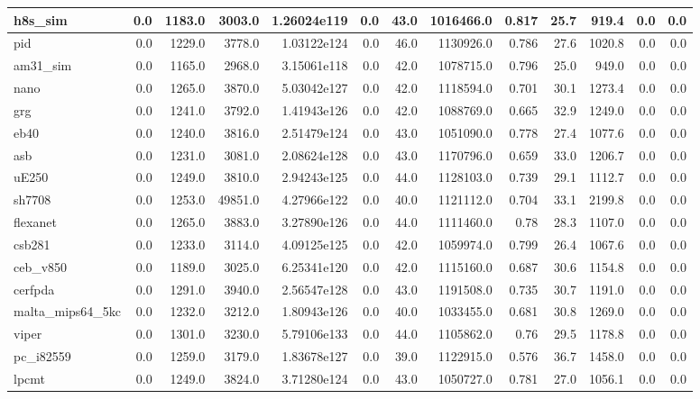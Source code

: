 \begin{tabular}{|l r r r r| r r r r r r | r r|}
\hline
h8s\_sim & 0.0 & 1183.0 & 3003.0 & 1.26024e119 & 0.0 & 43.0 & 1016466.0 & 0.817 & 25.7 & 919.4 & 0.0 & 0.0 \\
\hline
pid & 0.0 & 1229.0 & 3778.0 & 1.03122e124 & 0.0 & 46.0 & 1130926.0 & 0.786 & 27.6 & 1020.8 & 0.0 & 0.0 \\
\hline
am31\_sim & 0.0 & 1165.0 & 2968.0 & 3.15061e118 & 0.0 & 42.0 & 1078715.0 & 0.796 & 25.0 & 949.0 & 0.0 & 0.0 \\
\hline
nano & 0.0 & 1265.0 & 3870.0 & 5.03042e127 & 0.0 & 42.0 & 1118594.0 & 0.701 & 30.1 & 1273.4 & 0.0 & 0.0 \\
\hline
grg & 0.0 & 1241.0 & 3792.0 & 1.41943e126 & 0.0 & 42.0 & 1088769.0 & 0.665 & 32.9 & 1249.0 & 0.0 & 0.0 \\
\hline
eb40 & 0.0 & 1240.0 & 3816.0 & 2.51479e124 & 0.0 & 43.0 & 1051090.0 & 0.778 & 27.4 & 1077.6 & 0.0 & 0.0 \\
\hline
asb & 0.0 & 1231.0 & 3081.0 & 2.08624e128 & 0.0 & 43.0 & 1170796.0 & 0.659 & 33.0 & 1206.7 & 0.0 & 0.0 \\
\hline
uE250 & 0.0 & 1249.0 & 3810.0 & 2.94243e125 & 0.0 & 44.0 & 1128103.0 & 0.739 & 29.1 & 1112.7 & 0.0 & 0.0 \\
\hline
sh7708 & 0.0 & 1253.0 & 49851.0 & 4.27966e122 & 0.0 & 40.0 & 1121112.0 & 0.704 & 33.1 & 2199.8 & 0.0 & 0.0 \\
\hline
flexanet & 0.0 & 1265.0 & 3883.0 & 3.27890e126 & 0.0 & 44.0 & 1111460.0 & 0.78 & 28.3 & 1107.0 & 0.0 & 0.0 \\
\hline
csb281 & 0.0 & 1233.0 & 3114.0 & 4.09125e125 & 0.0 & 42.0 & 1059974.0 & 0.799 & 26.4 & 1067.6 & 0.0 & 0.0 \\
\hline
ceb\_v850 & 0.0 & 1189.0 & 3025.0 & 6.25341e120 & 0.0 & 42.0 & 1115160.0 & 0.687 & 30.6 & 1154.8 & 0.0 & 0.0 \\
\hline
cerfpda & 0.0 & 1291.0 & 3940.0 & 2.56547e128 & 0.0 & 43.0 & 1191508.0 & 0.735 & 30.7 & 1191.0 & 0.0 & 0.0 \\
\hline
malta\_mips64\_5kc & 0.0 & 1232.0 & 3212.0 & 1.80943e126 & 0.0 & 40.0 & 1033455.0 & 0.681 & 30.8 & 1269.0 & 0.0 & 0.0 \\
\hline
viper & 0.0 & 1301.0 & 3230.0 & 5.79106e133 & 0.0 & 44.0 & 1105862.0 & 0.76 & 29.5 & 1178.8 & 0.0 & 0.0 \\
\hline
pc\_i82559 & 0.0 & 1259.0 & 3179.0 & 1.83678e127 & 0.0 & 39.0 & 1122915.0 & 0.576 & 36.7 & 1458.0 & 0.0 & 0.0 \\
\hline
lpcmt & 0.0 & 1249.0 & 3824.0 & 3.71280e124 & 0.0 & 43.0 & 1050727.0 & 0.781 & 27.0 & 1056.1 & 0.0 & 0.0 \\

\end{tabular}
